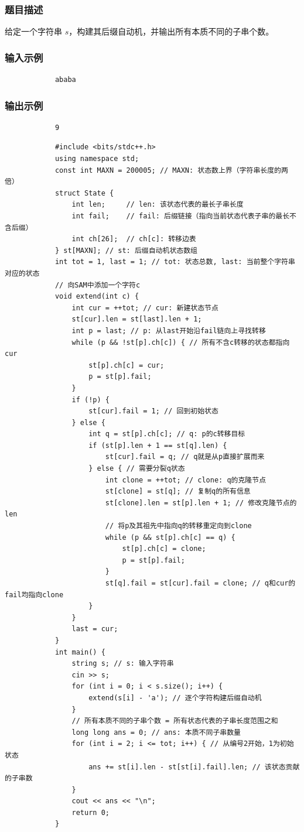 \documentclass[12pt,a4paper]{ctexart}
\begin{document}
		\subsubsection*{题目描述}
		给定一个字符串 \(s\)，构建其后缀自动机，并输出所有本质不同的子串个数。
		
		\subsubsection*{输入示例}
		\begin{verbatim}
			ababa
		\end{verbatim}
		
		\subsubsection*{输出示例}
		\begin{verbatim}
			9
		\end{verbatim}
		
		\begin{lstlisting}
			#include <bits/stdc++.h>
			using namespace std;
			const int MAXN = 200005; // MAXN: 状态数上界（字符串长度的两倍）
			struct State {
				int len;     // len: 该状态代表的最长子串长度
				int fail;    // fail: 后缀链接（指向当前状态代表子串的最长不含后缀）
				int ch[26];  // ch[c]: 转移边表
			} st[MAXN]; // st: 后缀自动机状态数组
			int tot = 1, last = 1; // tot: 状态总数, last: 当前整个字符串对应的状态
			// 向SAM中添加一个字符c
			void extend(int c) {
				int cur = ++tot; // cur: 新建状态节点
				st[cur].len = st[last].len + 1;
				int p = last; // p: 从last开始沿fail链向上寻找转移
				while (p && !st[p].ch[c]) { // 所有不含c转移的状态都指向cur
					st[p].ch[c] = cur;
					p = st[p].fail;
				}
				if (!p) {
					st[cur].fail = 1; // 回到初始状态
				} else {
					int q = st[p].ch[c]; // q: p的c转移目标
					if (st[p].len + 1 == st[q].len) {
						st[cur].fail = q; // q就是从p直接扩展而来
					} else { // 需要分裂q状态
						int clone = ++tot; // clone: q的克隆节点
						st[clone] = st[q]; // 复制q的所有信息
						st[clone].len = st[p].len + 1; // 修改克隆节点的len
						// 将p及其祖先中指向q的转移重定向到clone
						while (p && st[p].ch[c] == q) {
							st[p].ch[c] = clone;
							p = st[p].fail;
						}
						st[q].fail = st[cur].fail = clone; // q和cur的fail均指向clone
					}
				}
				last = cur;
			}
			int main() {
				string s; // s: 输入字符串
				cin >> s;
				for (int i = 0; i < s.size(); i++) {
					extend(s[i] - 'a'); // 逐个字符构建后缀自动机
				}
				// 所有本质不同的子串个数 = 所有状态代表的子串长度范围之和
				long long ans = 0; // ans: 本质不同子串数量
				for (int i = 2; i <= tot; i++) { // 从编号2开始，1为初始状态
					ans += st[i].len - st[st[i].fail].len; // 该状态贡献的子串数
				}
				cout << ans << "\n";
				return 0;
			}
		\end{lstlisting}
		
\end{document}
